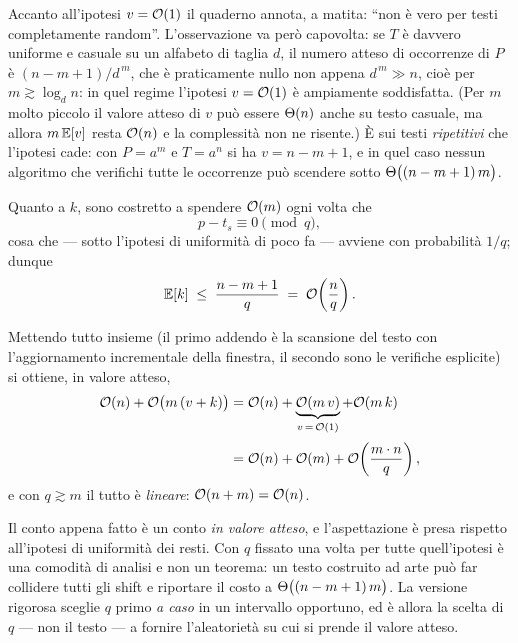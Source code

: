\begin{osservazione}
Accanto all'ipotesi $v = \mathcal{O}(1)$ il quaderno annota, a matita: ``non è vero per testi
completamente random''. L'osservazione va però capovolta: se $T$ è davvero uniforme e casuale
su un alfabeto di taglia $d$, il numero atteso di occorrenze di $P$ è $(n-m+1)/d^{\,m}$, che
è praticamente nullo non appena $d^{\,m} \gg n$, cioè per $m \gtrsim \log_d n$: in quel regime
l'ipotesi $v = \mathcal{O}(1)$ è ampiamente soddisfatta. (Per $m$ molto piccolo il valore atteso di
$v$ può essere $\Theta(n)$ anche su testo casuale, ma allora $m\,\mathbb{E}[v]$ resta $\mathcal{O}(n)$ e la
complessità non ne risente.) È sui testi \emph{ripetitivi} che l'ipotesi cade: con $P = a^{m}$
e $T = a^{n}$ si ha $v = n-m+1$, e in quel caso nessun algoritmo che verifichi tutte le
occorrenze può scendere sotto $\Theta\bigl((n-m+1)\,m\bigr)$.
\end{osservazione}

Quanto a $k$, sono costretto a spendere $\mathcal{O}(m)$ ogni volta che
\[
  p - t_s \equiv 0 \pmod{q},
\]
cosa che --- sotto l'ipotesi di uniformità di poco fa --- avviene con probabilità $1/q$;
dunque
\[
  \mathbb{E}[k] \;\le\; \frac{n-m+1}{q} \;=\; \mathcal{O}\!\left(\frac{n}{q}\right).
\]

Mettendo tutto insieme (il primo addendo è la scansione del testo con l'aggiornamento
incrementale della finestra, il secondo sono le verifiche esplicite) si ottiene, in valore
atteso,
\begin{align*}
  \mathcal{O}(n) + \mathcal{O}\bigl(m\,(v+k)\bigr)
    &= \mathcal{O}(n) + \underbrace{\mathcal{O}(m\,v)}_{v \,=\, \mathcal{O}(1)} + \mathcal{O}(m\,k) \\[2pt]
    &= \mathcal{O}(n) + \mathcal{O}(m) + \mathcal{O}\!\left(\frac{m\cdot n}{q}\right),
\end{align*}
e con $q \gtrsim m$ il tutto è \emph{lineare}: $\mathcal{O}(n+m) = \mathcal{O}(n)$.

\begin{osservazione}
Il conto appena fatto è un conto \emph{in valore atteso}, e l'aspettazione è presa rispetto
all'ipotesi di uniformità dei resti. Con $q$ fissato una volta per tutte quell'ipotesi è una
comodità di analisi e non un teorema: un testo costruito ad arte può far collidere tutti gli
shift e riportare il costo a $\Theta\bigl((n-m+1)\,m\bigr)$. La versione rigorosa sceglie $q$ primo \emph{a caso}
in un intervallo opportuno, ed è allora la scelta di $q$ --- non il testo --- a fornire
l'aleatorietà su cui si prende il valore atteso.
\end{osservazione}
